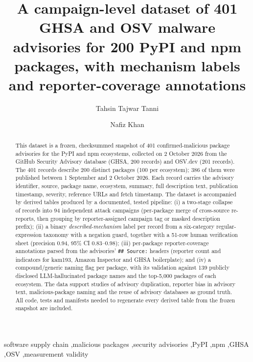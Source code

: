 \documentclass[preprint,12pt]{elsarticle}
\begin{document}
\sloppy

\begin{frontmatter}

\title{A campaign-level dataset of 401 GHSA and OSV malware advisories for 200 PyPI and npm packages, with mechanism labels and reporter-coverage annotations}

\author[1]{Tahsin Tajwar Tanni}
\author[1]{Nafiz Khan}

\begin{abstract}
This dataset is a frozen, checksummed snapshot of 401 confirmed-malicious package advisories for the PyPI and npm ecosystems, collected on 2 October 2026 from the GitHub Security Advisory database (GHSA, 200 records) and OSV.dev (201 records). The 401 records describe 200 distinct packages (100 per ecosystem); 386 of them were published between 1 September and 2 October 2026. Each record carries the advisory identifier, source, package name, ecosystem, summary, full description text, publication timestamp, severity, reference URLs and fetch timestamp. The dataset is accompanied by derived tables produced by a documented, tested pipeline: (i) a two-stage collapse of records into 94 independent attack campaigns (per-package merge of cross-source re-reports, then grouping by reporter-assigned campaign tag or masked description prefix); (ii) a binary \emph{described-mechanism} label per record from a six-category regular-expression taxonomy with a negation guard, together with a 51-row human verification sheet (precision 0.94, 95\% CI 0.83--0.98); (iii) per-package reporter-coverage annotations parsed from the advisories' \texttt{\#\# Source:} headers (reporter count and indicators for kam193, Amazon Inspector and GHSA boilerplate); and (iv) a compound/generic naming flag per package, with its validation against 139 publicly disclosed LLM-hallucinated package names and the top-5,000 packages of each ecosystem. The data support studies of advisory duplication, reporter bias in advisory text, malicious-package naming and the reuse of advisory databases as ground truth. All code, tests and manifests needed to regenerate every derived table from the frozen snapshot are included.
\end{abstract}

\begin{keyword}
software supply chain \sep malicious packages \sep security advisories \sep PyPI \sep npm \sep GHSA \sep OSV \sep measurement validity
\end{keyword}

\end{frontmatter}
\end{document}
